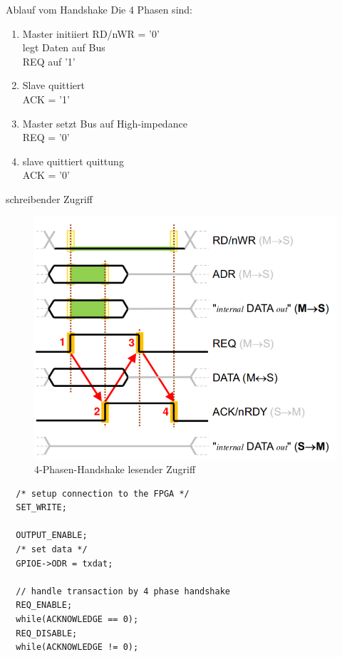   \begin{frame} {Ablauf vom Handshake}
    Die 4 Phasen sind:
    \begin{enumerate}
      \setlength\itemsep{.5cm}
      \item Master initiiert RD/nWR = '0'\\
            legt Daten auf Bus \\
            REQ auf '1'
      \item Slave quittiert\\
            ACK = '1'
      \item Master setzt Bus auf High-impedance\\
            REQ = '0'
      \item slave quittiert quittung\\
            ACK = '0'
    \end{enumerate}
  \end{frame}


  \begin{frame} {schreibender Zugriff}
    \begin{figure}[ht]
      \centering
      \includegraphics[height=0.7\textheight]{figs/schreibender_zugriff.png}
      \caption{4-Phasen-Handshake lesender Zugriff}
    \end{figure}
  \end{frame}


  \begin{frame} [fragile]
    \begin{lstlisting}
  /* setup connection to the FPGA */
  SET_WRITE;

  OUTPUT_ENABLE;
  /* set data */
  GPIOE->ODR = txdat;

  // handle transaction by 4 phase handshake
  REQ_ENABLE;
  while(ACKNOWLEDGE == 0);
  REQ_DISABLE;
  while(ACKNOWLEDGE != 0);
    \end{lstlisting}
  \end{frame}


